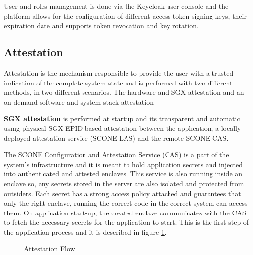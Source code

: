 User and roles management is done via the Keycloak user console and the platform allows for the configuration of different access token signing keys, their expiration date and supports token revocation and key rotation.

\subsection{Attestation}
\label{ssec:implementation_of_attestation}

Attestation is the mechanism responsible to provide the user with a trusted indication of the complete system state and is performed with two different methods, in two different scenarios. The hardware and \gls{SGX} attestation and an on-demand software and system stack attestation

\textbf{\gls{SGX} attestation} is performed at startup and its transparent and automatic using physical \gls{SGX} \gls{EPID}-based attestation between the application, a locally deployed attestation service (SCONE \gls{LAS}) and the remote SCONE \gls{CAS}. 

The SCONE Configuration and Attestation Service (\gls{CAS}) is a part of the system's infrastructure and it is meant to hold application secrets and injected into authenticated and attested enclaves. This service is also running inside an enclave so, any secrets stored in the server are also isolated and protected from outsiders. Each secret has a strong access policy attached and guarantees that only the right enclave, running the correct code in the correct system can access them. On application start-up, the created enclave communicates with the CAS to fetch the necessary secrets for the application to start. This is the first step of the application process and it is described in figure \ref{fig:attestation_flow}. 

\begin{figure}[htbp]
  \caption{Attestation Flow}
  \label{fig:attestation_flow}
\end{figure}

